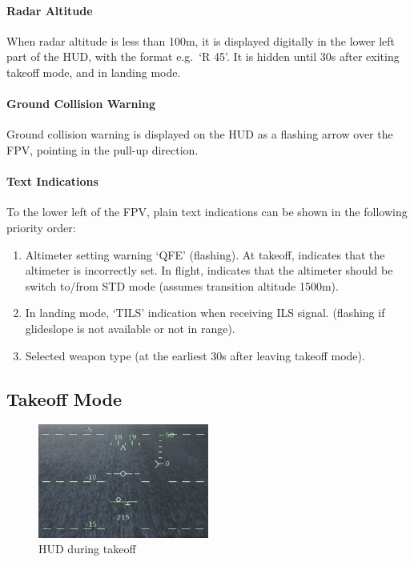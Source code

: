 \paragraph{Radar Altitude}
When radar altitude is less than 100m, it is displayed digitally
in the lower left part of the HUD, with the format e.g.\ `R 45'.
It is hidden until 30s after exiting takeoff mode, and in landing mode.

\paragraph{Ground Collision Warning}
Ground collision warning is displayed on the HUD as
a flashing arrow over the FPV, pointing in the pull-up direction.

\paragraph{Text Indications}
To the lower left of the FPV, plain text indications
can be shown in the following priority order:
\begin{enumerate}
  \item Altimeter setting warning `QFE' (flashing).
    At takeoff, indicates that the altimeter is incorrectly set.
    In flight, indicates that the altimeter should be switch to/from STD mode
    (assumes transition altitude 1500m).
  \item In landing mode, `TILS' indication when receiving ILS signal.
    (flashing if glideslope is not available or not in range).
  \item Selected weapon type (at the earliest 30s after leaving takeoff mode).
\end{enumerate}


\subsection{Takeoff Mode}
\begin{figure}[!ht]
  \centering
  \includegraphics[width=0.5\textwidth]{images/displays/ja-hud-takeoff.png}
  \caption{HUD during takeoff}
  \label{fig:hud-takeoff}
\end{figure}

